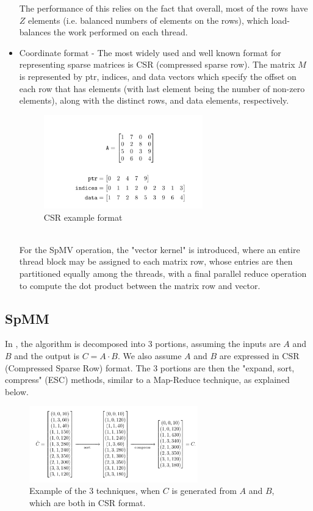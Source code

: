 \documentclass[12pt]{article}
\begin{document}
\begin{itemize}
\hspace{0.5cm}The performance of this relies on the fact that overall, most of the rows have $Z$ elements (i.e. balanced numbers of elements on the rows), which load-balances the work performed on each thread.


\item Coordinate format - The most widely used and well known format for representing sparse matrices is CSR (compressed sparse row). The matrix $M$ is represented by ptr, indices, and data vectors which specify the offset on each row that has elements (with last element being the number of non-zero elements), along with the distinct rows, and data elements, respectively. 
\begin{figure}[h]
  \caption{CSR example format}
  \centering 
  \includegraphics[width = 0.65\textwidth]{CSR.png}
\end{figure}
\\For the SpMV operation, the "vector kernel" is introduced, where an entire thread block may be assigned to each matrix row, whose entries are then partitioned equally among the threads, with a final parallel reduce operation to compute the dot product between the matrix row and vector. 
\end{itemize}




\subsection{SpMM}
\hspace{0.5cm}In \cite{bell_spmm}, the algorithm is decomposed into 3 portions, assuming the inputs are $A$ and $B$ and the output is $C = A \cdot B$. We also assume  $A$ and $B$ are expressed in CSR (Compressed Sparse Row) format. The 3 portions are then the "expand, sort, compress" (ESC) methods, similar to a Map-Reduce technique, as explained below. 

\begin{figure}[h]
  \caption{Example of the 3 techniques, when $C$ is generated from $A$ and $B$, which are both in CSR format. }
  \centering 
  \includegraphics[width = 0.65\textwidth]{expand_sort_compress.png}
\end{figure}
\end{document}
